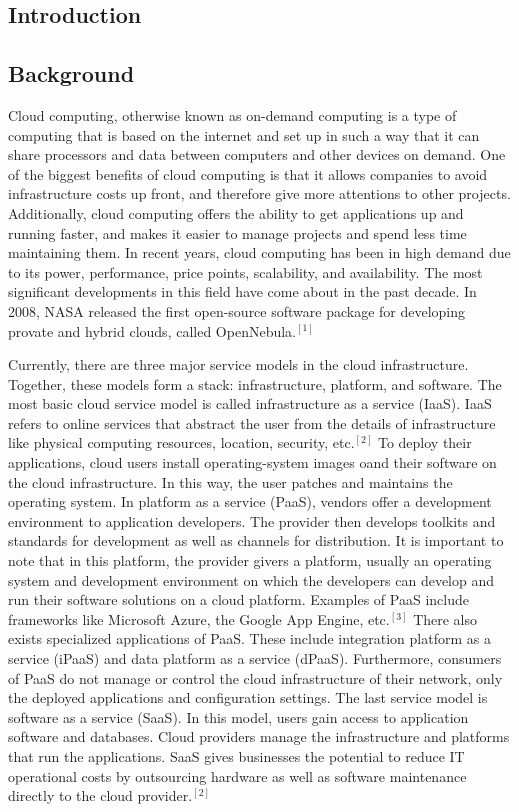 \documentclass[a4paper, 8pt]{article} %
\begin{document}
\begin{doublespacing}

\section*{Introduction}

\subsection*{Background}

Cloud computing, otherwise known as on-demand computing is a type of computing that is based on the internet and set up in such a way that it can share processors and data between computers and other devices on demand.  One of the biggest benefits of cloud computing is that it allows companies to avoid infrastructure costs up front, and therefore give more attentions to other projects.  Additionally, cloud computing offers the ability to get applications up and running faster, and makes it easier to manage projects and spend less time maintaining them.  In recent years, cloud computing has been in high demand due to its power, performance, price points, scalability, and availability.  The most significant developments in this field have come about in the past decade.  In 2008, NASA released the first open-source software package for developing provate and hybrid clouds, called OpenNebula.$^{[1]}$  

Currently, there are three major service models in the cloud infrastructure.  Together, these models form a stack: infrastructure, platform, and software.  The most basic cloud service model is called infrastructure as a service (IaaS).  IaaS refers to online services that abstract the user from the details of infrastructure like physical computing resources, location, security, etc.$^{[2]}$  To deploy their applications, cloud users install operating-system images oand their software on the cloud infrastructure.  In this way, the user patches and maintains the operating system.  In platform as a service (PaaS), vendors offer a development environment to application developers.  The provider then develops toolkits and standards for development as well as channels for distribution.  It is important to note that in this platform, the provider givers a platform, usually an operating system and development environment on which the developers can develop and run their software solutions on a cloud platform.  Examples of PaaS include frameworks like Microsoft Azure, the Google App Engine, etc.$^{[3]}$  There also exists specialized applications of PaaS.  These include integration platform as a service (iPaaS) and data platform as a service (dPaaS).  Furthermore, consumers of PaaS do not manage or control the cloud infrastructure of their network, only the deployed applications and configuration settings.  The last service model is software as a service (SaaS).  In this model, users gain access to application software and databases.  Cloud providers manage the infrastructure and platforms that run the applications.  SaaS gives businesses the potential to reduce IT operational costs by outsourcing hardware as well as software maintenance directly to the cloud provider.$^{[2]}$  


\end{doublespacing}
\end{document}
